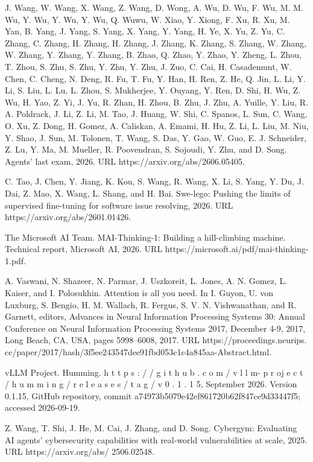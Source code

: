 \documentclass[
  10
]{article}
\begin{document}
J. Wang, W. Wang, X. Wang, Z. Wang, D. Wong, A. Wu, D. Wu, F. Wu, M. M.
Wu, Y. Wu, Y. Wu, Y. Wu, Q. Wuwu, W. Xiao, Y. Xiong, F. Xu, R. Xu, M.
Yan, B. Yang, J. Yang, S. Yang, X. Yang, Y. Yang, H. Ye, X. Yu, Z. Yu,
C. Zhang, C. Zhang, H. Zhang, H. Zhang, J. Zhang, K. Zhang, S. Zhang, W.
Zhang, W. Zhang, Y. Zhang, Y. Zhang, B. Zhao, Q. Zhao, Y. Zhao, Y.
Zheng, L. Zhou, T. Zhou, S. Zhu, S. Zhu, Y. Zhu, Y. Zhu, J. Zuo, C. Cai,
H. Casademunt, W. Chen, C. Cheng, N. Deng, R. Fu, T. Fu, Y. Han, H. Ren,
Z. He, Q. Jin, L. Li, Y. Li, S. Liu, L. Lu, L. Zhou, S. Mukherjee, Y.
Ouyang, Y. Ren, D. Shi, H. Wu, Z. Wu, H. Yao, Z. Yi, J. Yu, R. Zhan, H.
Zhou, B. Zhu, J. Zhu, A. Yuille, Y. Liu, R. A. Poldrack, J. Li, Z. Li,
M. Tao, J. Huang, W. Shi, C. Spanos, L. Sun, C. Wang, O. Xu, Z. Dong, H.
Gomez, A. Caliskan, A. Emami, H. Hu, Z. Li, L. Liu, M. Niu, Y. Shao, J.
Sun, M. Tolonen, T. Wang, S. Das, Y. Gao, W. Guo, E. J. Schneider, Z.
Lu, Y. Ma, M. Mueller, R. Poovendran, S. Sojoudi, Y. Zhu, and D. Song.
Agents' last exam, 2026. URL https://arxiv.org/abs/2606.05405.

C. Tao, J. Chen, Y. Jiang, K. Kou, S. Wang, R. Wang, X. Li, S. Yang, Y.
Du, J. Dai, Z. Mao, X. Wang, L. Shang, and H. Bai. Swe-lego: Pushing the
limits of supervised fine-tuning for software issue resolving, 2026. URL
https://arxiv.org/abs/2601.01426.

The Microsoft AI Team. MAI-Thinking-1: Building a hill-climbing machine.
Technical report, Microsoft AI, 2026. URL
https://microsoft.ai/pdf/mai-thinking-1.pdf.

A. Vaswani, N. Shazeer, N. Parmar, J. Uszkoreit, L. Jones, A. N. Gomez,
L. Kaiser, and I. Polosukhin. Attention is all you need. In I. Guyon, U.
von Luxburg, S. Bengio, H. M. Wallach, R. Fergus, S. V. N. Vishwanathan,
and R. Garnett, editors, Advances in Neural Information Processing
Systems 30: Annual Conference on Neural Information Processing Systems
2017, December 4-9, 2017, Long Beach, CA, USA, pages 5998--6008, 2017.
URL https://proceedings.neurips.
cc/paper/2017/hash/3f5ee243547dee91fbd053c1c4a845aa-Abstract.html.

vLLM Project. Humming. h t t p s : / / g i t h u b . c o m / v l l m- p
r oj e c t / h u m m i n g / r e l e a s e s / t a g / v 0 . 1 . 1 5,
September 2026. Version 0.1.15, GitHub repository, commit
a74973b5079e42ef861720b62f847ce9d33447f5; accessed 2026-09-19.

Z. Wang, T. Shi, J. He, M. Cai, J. Zhang, and D. Song. Cybergym:
Evaluating AI agents' cybersecurity capabilities with real-world
vulnerabilities at scale, 2025. URL https://arxiv.org/abs/ 2506.02548.
\end{document}
